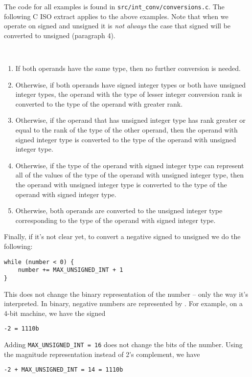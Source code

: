 The code for all examples is found in \texttt{src/int\_conv/conversions.c}. The following C ISO extract applies to the above examples. Note that when we operate on signed and unsigned it is \textit{not always} the case that signed will be converted to unsigned (paragraph 4).
\begin{takeaway}[C ISO 2007 -- 6.3.1.8/1]
\; \\
\begin{enumerate}

\item If both operands have the same type, then no further conversion is needed. 

\item Otherwise, if both operands have signed integer types or both have unsigned integer  types,  the  operand  with  the  type  of  lesser  integer  conversion  rank  is converted to the type of the operand with greater rank.

\item Otherwise,  if  the  operand  that  has  unsigned  integer  type  has  rank  greater  or equal  to  the  rank  of  the  type  of  the  other  operand,  then  the  operand  with signed  integer  type  is  converted  to  the  type  of  the  operand  with  unsigned integer type.

\item Otherwise, if the type of the operand with signed integer type can represent all of the values of the type of the operand with unsigned integer type, then the  operand  with  unsigned  integer  type  is  converted  to  the  type  of  the operand with signed integer type.

\item Otherwise,   both   operands   are   converted   to   the   unsigned   integer   type corresponding to the type of the operand with signed integer type.
\end{enumerate}
\end{takeaway}
Finally, if it's not clear yet, to convert a negative signed to unsigned we do the following:

\begin{verbatim}
while (number < 0) {
    number += MAX_UNSIGNED_INT + 1
}
\end{verbatim}
This does not change the binary representation of the number -- only the way it's interpreted. In binary, negative numbers are represented by . For example, on a 4-bit machine, we have the signed
\begin{verbatim}
-2 = 1110b
\end{verbatim}
Adding \texttt{MAX\_UNSIGNED\_INT = 16} does not change the bits of the number. Using the magnitude representation instead of 2's complement, we have
\begin{verbatim}
-2 + MAX_UNSIGNED_INT = 14 = 1110b
\end{verbatim}

